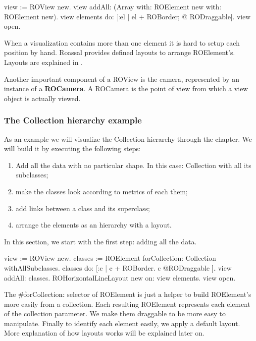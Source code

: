 \documentclass[a4paper,10pt,twoside]{book}
\begin{document}
\begin{code}{}
view := ROView new.
view addAll: (Array with: ROElement new with: ROElement new).
view elements do: [:el | el + ROBorder; @ RODraggable].
view open.
\end{code}

When a visualization contains more than one element it is hard to setup each position by hand. Roassal provides defined layouts to arrange ROElement's. Layouts are explained in  .

Another important component of a ROView is the camera, represented by an instance of a \textbf{ROCamera}. A ROCamera is the point of view from which a view object is actually viewed.

\subsubsection*{The Collection hierarchy example}
As an example we will visualize the Collection hierarchy through the chapter. We will build it by executing the following steps:
\begin{enumerate}
\item Add all the data with no particular shape. In this case: Collection with all its subclasses;
\item make the classes look according to metrics of each them;
\item add links between a class and its superclass;
\item arrange the elements as an hierarchy with a layout.
\end{enumerate}

In this section, we start with the first step: adding all the data.

\begin{code}{}
view := ROView new.
classes := ROElement forCollection: Collection withAllSubclasses.
classes 
	do: [:c | c + ROBorder.
			c @RODraggable ].
view addAll: classes.
ROHorizontalLineLayout new on: view elements.
view open.
\end{code}

The \#forCollection: selector of ROElement is just a helper to build ROElement's more easily from a collection. Each resulting ROElement represents each element of the collection parameter. We make them draggable to be more easy to manipulate.
Finally to identify each element easily, we apply a default layout. More explanation of how layouts works will be explained later on. 
\end{document}
